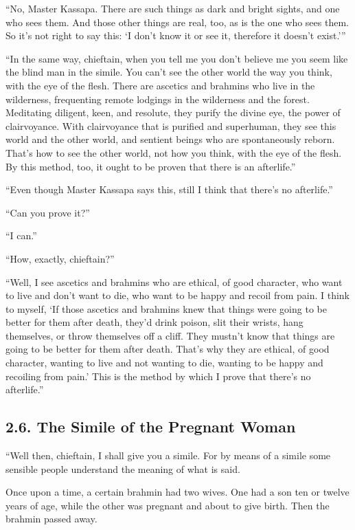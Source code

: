 \documentclass[12pt,openany]{book}%
\begin{document}
“No, Master Kassapa. There are such things as dark and bright sights, and one who sees them. And those other things are real, too, as is the one who sees them. So it’s not right to say this: ‘I don’t know it or see it, therefore it doesn’t exist.’” 

“In the same way, chieftain, when you tell me you don’t believe me you seem like the blind man in the simile. You can’t see the other world the way you think, with the eye of the flesh. There are ascetics and brahmins who live in the wilderness, frequenting remote lodgings in the wilderness and the forest. Meditating diligent, keen, and resolute, they purify the divine eye, the power of clairvoyance. With clairvoyance that is purified and superhuman, they see this world and the other world, and sentient beings who are spontaneously reborn. That’s how to see the other world, not how you think, with the eye of the flesh. By this method, too, it ought to be proven that there is an afterlife.” 

“Even though Master Kassapa says this, still I think that there’s no afterlife.” 

“Can you prove it?” 

“I can.” 

“How, exactly, chieftain?” 

“Well, I see ascetics and brahmins who are ethical, of good character, who want to live and don’t want to die, who want to be happy and recoil from pain. I think to myself, ‘If those ascetics and brahmins knew that things were going to be better for them after death, they’d drink poison, slit their wrists, hang themselves, or throw themselves off a cliff. They mustn’t know that things are going to be better for them after death. That’s why they are ethical, of good character, wanting to live and not wanting to die, wanting to be happy and recoiling from pain.’ This is the method by which I prove that there’s no afterlife.” 

\subsection*{2.6. The Simile of the Pregnant Woman }

“Well then, chieftain, I shall give you a simile. For by means of a simile some sensible people understand the meaning of what is said. 

Once upon a time, a certain brahmin had two wives. One had a son ten or twelve years of age, while the other was pregnant and about to give birth. Then the brahmin passed away. 
\end{document}
